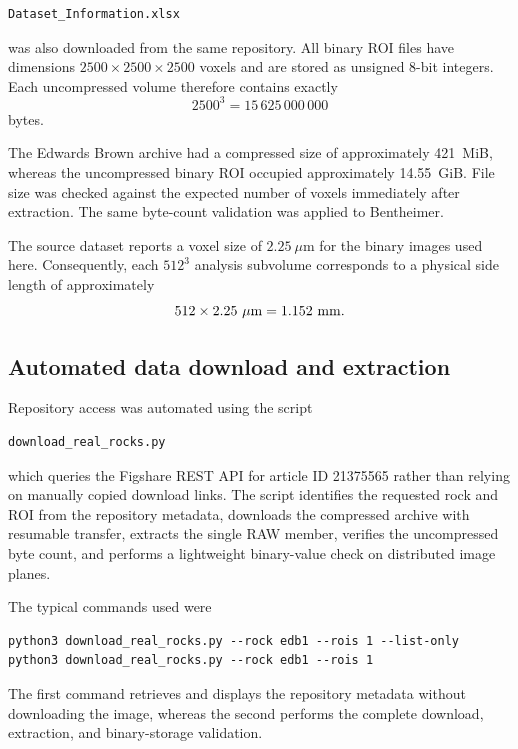 \documentclass{article}
\begin{document}
\begin{verbatim}
Dataset_Information.xlsx
\end{verbatim}

was also downloaded from the same repository. All binary ROI files have dimensions $2500\times2500\times2500$ voxels and are stored as unsigned 8-bit integers. Each uncompressed volume therefore contains exactly
%
\[
2500^3 = 15\,625\,000\,000
\]
%
bytes.

The Edwards Brown archive had a compressed size of approximately 421~MiB, whereas the uncompressed binary ROI occupied approximately 14.55~GiB. File size was checked against the expected number of voxels immediately after extraction. The same byte-count validation was applied to Bentheimer.

The source dataset reports a voxel size of $2.25~\mu$m for the binary images used here. Consequently, each $512^3$ analysis subvolume corresponds to a physical side length of approximately
%
\[
512\times2.25~\mu{\rm m}=1.152~{\rm mm}.
\]

\subsection{Automated data download and extraction}
\label{sec:SI_download}

Repository access was automated using the script

\begin{verbatim}
download_real_rocks.py
\end{verbatim}

which queries the Figshare REST API for article ID 21375565 rather than relying on manually copied download links. The script identifies the requested rock and ROI from the repository metadata, downloads the compressed archive with resumable transfer, extracts the single RAW member, verifies the uncompressed byte count, and performs a lightweight binary-value check on distributed image planes.

The typical commands used were

\begin{verbatim}
python3 download_real_rocks.py --rock edb1 --rois 1 --list-only
python3 download_real_rocks.py --rock edb1 --rois 1
\end{verbatim}

The first command retrieves and displays the repository metadata without downloading the image, whereas the second performs the complete download, extraction, and binary-storage validation.
\end{document}

